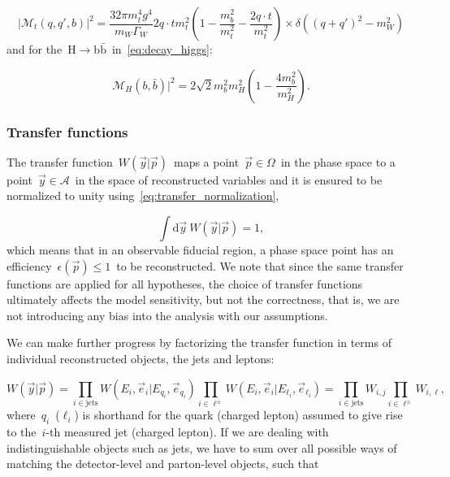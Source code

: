 \begin{equation}
\label{eq:decay_top}
|\mathcal{M}_t(q,q',b)|^2 = \frac{32\pi m_t^4 g^4}{m_W \Gamma_W} {2 q\cdot t}{m_t^2} (1 - \frac{m_b^2}{m_t^2} - \frac{2 q \cdot t}{m_t^2}) \times \delta((q+q')^2 - m_W^2)
\end{equation}
and for the~$\mathrm{H} \rightarrow \mathrm{b}\bar{\mathrm{b}}$~in~\cref{eq:decay_higgs}:

\begin{equation}
\label{eq:decay_higgs}
\mathcal{M}_H(b,\bar{b})|^2 = 2\sqrt{2} m_b^2 m_H^2 (1 - \frac{4m_b^2}{m_H^2}).
\end{equation}

\subsubsection{Transfer functions}
\label{sec:transfer_functions}

The transfer function~$W(\vec{y} | \vec{p})$~maps a point~$\vec{p} \in \Omega$~in the phase space to a point~$\vec{y} \in \mathcal{A}$~in the space of reconstructed variables and it is ensured to be normalized to unity using~\cref{eq:transfer_normalization},

\begin{equation}
\label{eq:transfer_normalization}
\int \mathrm{d}\vec{y}~W(\vec{y} | \vec{p}) = 1,
\end{equation}
which means that in an observable fiducial region, a phase space point has an efficiency~$\epsilon(\vec{p}) \leq 1$~to be reconstructed. We note that since the same transfer functions are applied for all hypotheses, the choice of transfer functions ultimately affects the model sensitivity, but not the correctness, that is, we are not introducing any bias into the analysis with our assumptions.

We can make further progress by factorizing the transfer function in terms of individual reconstructed objects, the jets and leptons:

\begin{equation}
W(\vec{y} | \vec{p}) = \prod_{i\in \mathrm{jets}} W(E_i, \vec{e}_i | E_{q_i}, \vec{e}_{q_i})
\prod_{i\in \ell^\pm} W(E_i, \vec{e}_i | E_{\ell_i}, \vec{e}_{\ell_i}) = \prod_{i \in \mathrm{jets}} W_{i,j} \prod_{i \in \ell^\pm} W_{i,\ell},
\end{equation}
where~$q_i$~($\ell_i$) is shorthand for the quark (charged lepton) assumed to give rise to the~$i$-th measured jet (charged lepton). If we are dealing with indistinguishable objects such as jets, we have to sum over all possible ways of matching the detector-level and parton-level objects, such that


